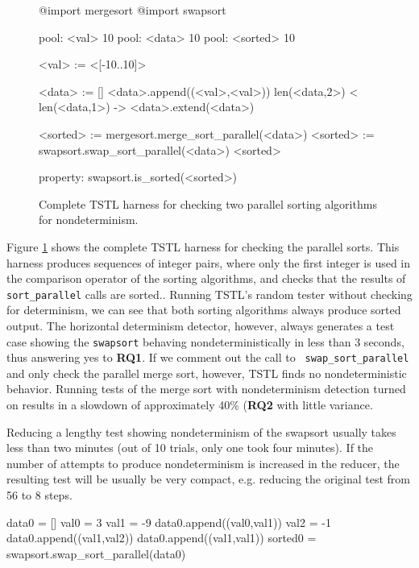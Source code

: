 \begin{figure}
{\scriptsize
\begin{code}
@import mergesort
@import swapsort

pool: <val> 10
pool: <data> 10
pool: <sorted> 10

<val> := <[-10..10]>

<data> := []
<data>.append((<val>,<val>))
len(<data,2>) < len(<data,1>) -> <data>.extend(<data>)

<sorted> := mergesort.merge\_sort\_parallel(<data>)
<sorted> := swapsort.swap\_sort\_parallel(<data>)
<sorted>

property: swapsort.is\_sorted(<sorted>)
\end{code}
}
\caption {Complete TSTL harness for checking two parallel sorting
  algorithms for nondeterminism.}
\label{fig:parallelcode}
\end{figure}

Figure \ref{fig:parallelcode} shows the complete TSTL harness for
checking the parallel sorts.  This harness produces sequences of
integer pairs, where only the first integer is used in the comparison
operator of the sorting algorithms, and checks that the results of
{\tt sort\_parallel} calls are sorted..
Running TSTL's random tester without checking for determinism, we can
see that both sorting algorithms always produce sorted output.  The
horizontal determinism detector, however, always generates a 
test case showing the {\tt swapsort} behaving nondeterministically in
less than 3 seconds, thus
answering yes to {\bf  RQ1}.  If we comment out the call to {\tt
  swap\_sort\_parallel} and only check the parallel merge sort, however, TSTL
finds no nondeterministic behavior.  Running tests of the merge sort
with nondeterminism detection turned on results in a slowdown of approximately
40\% ({\bf RQ2} with little variance.

Reducing a lengthy test showing nondeterminism of the swapsort usually takes less than two
minutes (out of 10 trials, only one took four minutes).  If the number of attempts to produce nondeterminism is
increased in the reducer, the resulting test will be usually be very compact, e.g.
reducing the original test from 56 to 8 steps.

{\scriptsize
\begin{code}
data0 = []    
val0 = 3      
val1 = -9    
data0.append((val0,val1)) 
val2 = -1                         
data0.append((val1,val2))
data0.append((val1,val1))  
sorted0 = swapsort.swap\_sort\_parallel(data0)      
\end{code}
}

